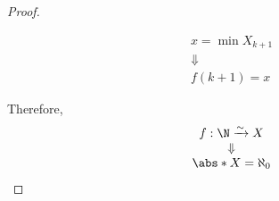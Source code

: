 \begin{proof}
\begin{itemize}
\begin{itemize}
\[\begin{array}{c}
                      x = \min X_{k + 1}                \\
                      \Downarrow                        \\
                      f(k + 1) = x
                    \end{array}
                  \]
          \end{itemize}
  \end{itemize}
  Therefore,
  \[
    \begin{array}{c}
      f: \N \xrightarrow{\sim} X \\
      \Downarrow                 \\
      \abs*{X} = \aleph_{0}
    \end{array}
  \]
\end{proof}
